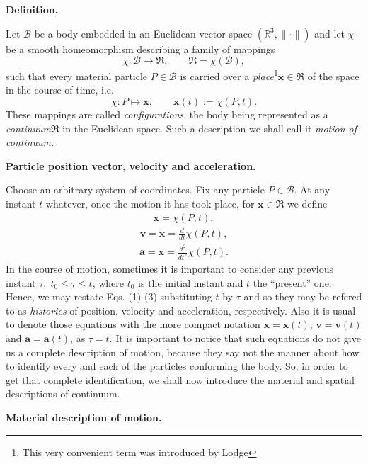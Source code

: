 \documentclass[12pt]{article}
\begin{document}
\textbf{Definition.}

Let $\mathscr{B}$ be a body embedded in an Euclidean vector space 
$(\mathbb{R}^3,\lVert \cdot \rVert)$ and let $\chi$ be a smooth homeomorphism describing a family of mappings
\[\chi\colon \mathscr{B} \to \Re, \qquad \Re=\chi(\mathscr{B}),\]
such that every material particle $P\in\mathscr{B}$ is carried over a {\em place}\footnote{This very convenient term was introduced by Lodge\cite{cite:Lodge}}$\mathbf{x}\in\Re$ of the space in the course of time, i.e.
\[\chi\colon P\mapsto \mathbf{x}, \qquad \mathbf{x}(t):=\chi(P,t).\]
These mappings are called {\em configurations}, the body being represented as a {\em continuum}$\Re$ in the Euclidean space. Such a description we shall call it {\em motion of  continuum.}

\textbf{Particle position vector, velocity and acceleration.}

Choose an arbitrary system of coordinates. Fix any particle $P\in\mathscr{B}$. At any instant $t$ whatever, once the motion it has took place, for $\mathbf{x}\in\Re$ we define
\begin{align}
\mathbf{x}=\chi(P,t),
\end{align}
\begin{align}
\mathbf{v}=\mathbf{\dot{x}}=\frac{d}{dt}\chi(P,t),
\end{align}
\begin{align}   
\mathbf{a}=\mathbf{\ddot{x}}=\frac{d^2}{dt^2}\chi(P,t). 
\end{align}
In the course of motion, sometimes it is important to consider any previous instant $\tau,\; t_0 \leq \tau \leq t$,\; where $t_0$ is the initial instant and $t$ the ``present'' one. Hence, we may restate Eqs. (1)-(3) substituting $t$ by $\tau$ and so they may be refered to as {\em histories} of position, velocity and acceleration, respectively. Also it is usual to denote those equations with the more compact notation $\mathbf{x}=\mathbf{x}(t)$, $\mathbf{v}=\mathbf{v}(t)$ and $\mathbf{a}=\mathbf{a}(t)$, as $\tau=t$.
It is important to notice that such  equations do not give us a complete description of motion, because they say not the manner about how to identify every and each of the particles conforming  the body. So, in order to get that complete identification, we shall now introduce the material and spatial descriptions of  continuum.

\textbf{Material description of motion.}
\end{document}

